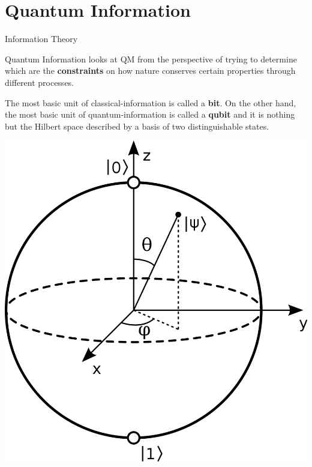 \documentclass[9pt, handout, aspectratio=169]{beamer}	%
\begin{document}


\section{Quantum Information}

	\begin{frame}{Information Theory}

		Quantum Information looks at QM from the perspective of trying to determine which are the \textbf{constraints} on how nature conserves certain properties through different processes.

		\begin{multicols}{2}

			The most basic unit of classical-information is called a \textbf{bit}. On the other hand, the most basic unit of quantum-information is called a \textbf{qubit} and it is nothing but the Hilbert space described by a basis of two distinguishable states.

			\columnbreak
			\begin{center}
		\includegraphics[width=.26\paperwidth]{Figures/Bloch_Sphere}
			\end{center}

		\end{multicols}

	\end{frame}
\end{document}
